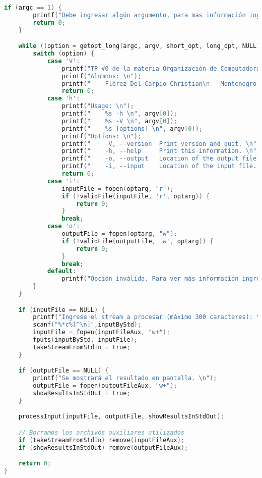 \documentclass[a4paper]{article}
\begin{document}
\begin{lstlisting}[language=C]
    if (argc == 1) {
        printf("Debe ingresar algún argumento, para mas información ingrese -h \n");
        return 0;
    }

    while ((option = getopt_long(argc, argv, short_opt, long_opt, NULL)) != -1) {
        switch (option) {
            case 'V':
                printf("TP #0 de la materia Organización de Computadoras \n");
                printf("Alumnos: \n");
                printf("    Flórez Del Carpio Christian\n   Montenegro Josefina \n  Quino Lopez Julian \n");
                return 0;
            case 'h':
                printf("Usage: \n");
                printf("    %s -h \n", argv[0]);
                printf("    %s -V \n", argv[0]);
                printf("    %s [options] \n", argv[0]);
                printf("Options: \n");
                printf("    -V, --version  Print version and quit. \n");
                printf("    -h, --help     Print this information. \n");
                printf("    -o, --output   Location of the output file. \n");
                printf("    -i, --input    Location of the input file. \n");
                return 0;
            case 'i':
                inputFile = fopen(optarg, "r");
                if (!validFile(inputFile, 'r', optarg)) {
                    return 0;
                }
                break;
            case 'o':
                outputFile = fopen(optarg, "w");
                if (!validFile(outputFile, 'w', optarg)) {
                    return 0;
                }
                break;
            default:
                printf("Opción inválida. Para ver más información ingrese -h. \n");
        }
    }

    if (inputFile == NULL) {
        printf("Ingrese el stream a procesar (máximo 300 caracteres): \n");
        scanf("%*c%[^\n]",inputByStd);
        inputFile = fopen(inputFileAux, "w+");
        fputs(inputByStd, inputFile);
        takeStreamFromStdIn = true;
    }

    if (outputFile == NULL) {
        printf("Se mostrará el resultado en pantalla. \n");
        outputFile = fopen(outputFileAux, "w+");
        showResultsInStdOut = true;
    }

    processInput(inputFile, outputFile, showResultsInStdOut);

    // Borramos los archivos auxiliares utilizados
    if (takeStreamFromStdIn) remove(inputFileAux);
    if (showResultsInStdOut) remove(outputFileAux);

    return 0;
}
\end{lstlisting}
\end{document}
